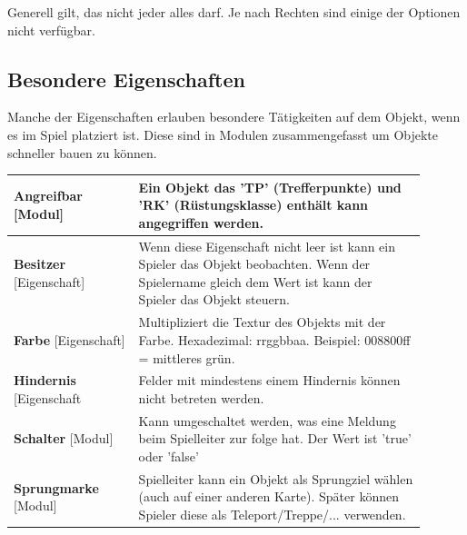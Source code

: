 \documentclass[german,10pt,a4paper,twocolumn,colorscheme=darkblue]{orarticle}
\begin{document}
		Generell gilt, das nicht jeder alles darf. Je nach Rechten sind einige der Optionen nicht verfügbar.
	
		\subsection{Besondere Eigenschaften}
			Manche der Eigenschaften erlauben besondere Tätigkeiten auf dem Objekt, wenn es im Spiel platziert ist. Diese sind in Modulen zusammengefasst um Objekte schneller bauen zu können.\\
			
			\begin{supertabular}{p{0.275\linewidth}|p{0.62\linewidth}}
				\textbf{Angreifbar} [Modul]      & Ein Objekt das 'TP' (Trefferpunkte) und 'RK' (Rüstungsklasse) enthält kann angegriffen werden. \\\hline
				\textbf{Besitzer} [Eigenschaft]  & Wenn diese Eigenschaft nicht leer ist kann ein Spieler das Objekt beobachten. Wenn der Spielername gleich dem Wert ist kann der Spieler das Objekt steuern.\\\hline
				\textbf{Farbe} [Eigenschaft]     & Multipliziert die Textur des Objekts mit der Farbe. Hexadezimal: rrggbbaa. Beispiel: 008800ff = mittleres grün.\\\hline
				\textbf{Hindernis} [Eigenschaft  & Felder mit mindestens einem Hindernis können nicht betreten werden.\\\hline
				\textbf{Schalter} [Modul]        & Kann umgeschaltet werden, was eine Meldung beim Spielleiter zur folge hat. Der Wert ist 'true' oder 'false'\\\hline
				\textbf{Sprungmarke} [Modul]     & Spielleiter kann ein Objekt als Sprungziel wählen (auch auf einer anderen Karte). Später können Spieler diese als Teleport/Treppe/... verwenden.\cr
			\end{supertabular}
			
\end{document}
